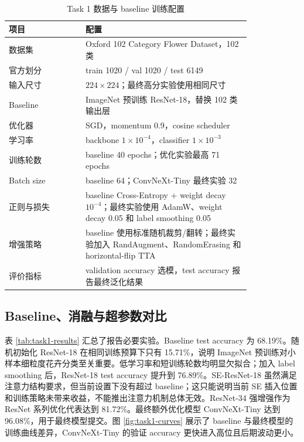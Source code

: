 \documentclass[lang=cn,a4paper,newtx,code=minted]{elegantpaper}
\begin{document}
\begin{table}[!htbp]
\centering
\small
\caption{Task 1 数据与 baseline 训练配置}
\label{tab:task1-config}
\begin{tabular}{@{}L{0.26\linewidth}L{0.56\linewidth}@{}}
\toprule
项目 & 配置 \\
\midrule
数据集 & Oxford 102 Category Flower Dataset，102 类 \\
官方划分 & train 1020 / val 1020 / test 6149 \\
输入尺寸 & $224\times224$；最终高分实验使用相同尺寸 \\
Baseline & ImageNet 预训练 ResNet-18，替换 102 类输出层 \\
优化器 & SGD，momentum 0.9，cosine scheduler \\
学习率 & backbone $1\times10^{-4}$，classifier $1\times10^{-3}$ \\
训练轮数 & baseline 40 epochs；优化实验最高 71 epochs \\
Batch size & baseline 64；ConvNeXt-Tiny 最终实验 32 \\
正则与损失 & baseline Cross-Entropy + weight decay $10^{-4}$；最终实验使用 AdamW、weight decay 0.05 和 label smoothing 0.05 \\
增强策略 & baseline 使用标准随机裁剪/翻转；最终实验加入 RandAugment、RandomErasing 和 horizontal-flip TTA \\
评价指标 & validation accuracy 选模，test accuracy 报告最终泛化结果 \\
\bottomrule
\end{tabular}
\end{table}

\subsection{Baseline、消融与超参数对比}

表 \ref{tab:task1-results} 汇总了报告必要实验。Baseline test accuracy 为 68.19\%。随机初始化 ResNet-18 在相同训练预算下只有 15.71\%，说明 ImageNet 预训练对小样本细粒度花卉分类至关重要。低学习率和短训练轮数均明显欠拟合；加入 label smoothing 后，ResNet-18 test accuracy 提升到 76.89\%。SE-ResNet-18 虽然满足注意力结构要求，但当前设置下没有超过 baseline；这只能说明当前 SE 插入位置和训练策略未带来收益，不能推出注意力机制总体无效。ResNet-34 强增强作为 ResNet 系列优化代表达到 81.72\%。最终额外优化模型 ConvNeXt-Tiny 达到 96.08\%，用于最终模型提交。图 \ref{fig:task1-curves} 展示了 baseline 与最终模型的训练曲线差异，ConvNeXt-Tiny 的验证 accuracy 更快进入高位且后期波动更小。
\end{document}
